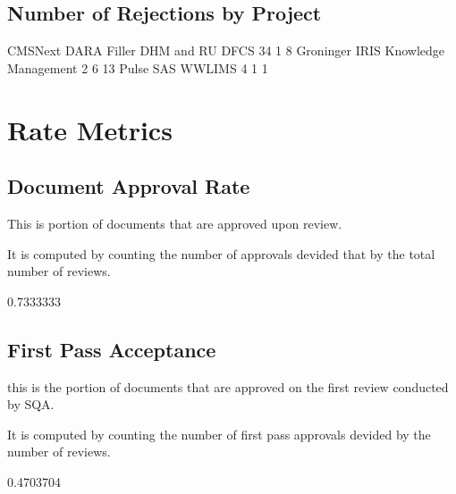 \documentclass{article}
\begin{document}
\subsection{Number of Rejections by Project}

\begin{Schunk}
\begin{Soutput}
               CMSNext DARA Filler DHM and RU                   DFCS 
                    34                      1                      8 
             Groninger                   IRIS   Knowledge Management 
                     2                      6                     13 
                 Pulse                    SAS                 WWLIMS 
                     4                      1                      1 
\end{Soutput}
\end{Schunk}



\section{Rate Metrics}
\subsection{Document Approval Rate}
This is portion of documents that are approved upon review.

It is computed by counting the number of approvals devided that by the total number of reviews.

\begin{Schunk}
\begin{Soutput}
[1] 0.7333333
\end{Soutput}
\end{Schunk}

\subsection{First Pass Acceptance}
this is the portion of documents that are approved on the first review conducted
by SQA.

It is computed by counting the number of first pass approvals devided by
the number of reviews.

\begin{Schunk}
\begin{Soutput}
[1] 0.4703704
\end{Soutput}
\end{Schunk}
\end{document}
